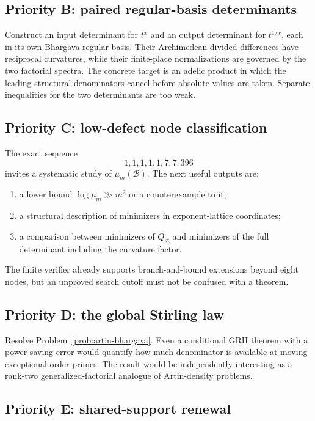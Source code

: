 \documentclass[11pt,oneside]{article}
\theoremstyle{definition}
\theoremstyle{remark}
\newcommand{\B}{\mathcal B}
\begin{document}
\subsection{Priority B: paired regular-basis determinants}

Construct an input determinant for \(t^x\) and an output determinant for \(t^{1/x}\), each in
its own Bhargava regular basis.  Their Archimedean divided differences have reciprocal
curvatures, while their finite-place normalizations are governed by the two factorial spectra.
The concrete target is an adelic product in which the leading structural denominators cancel
before absolute values are taken.  Separate inequalities for the two determinants are too
weak.

\subsection{Priority C: low-defect node classification}

The exact sequence
\[
 1,1,1,1,1,7,7,396
\]
invites a systematic study of \(\mu_m(\B)\).  The next useful outputs are:
\begin{enumerate}
\item a lower bound \(\log\mu_m\gg m^2\) or a counterexample to it;
\item a structural description of minimizers in exponent-lattice coordinates;
\item a comparison between minimizers of \(Q_{\B}\) and minimizers of the full determinant
including the curvature factor.
\end{enumerate}
The finite verifier already supports branch-and-bound extensions beyond eight nodes, but an
unproved search cutoff must not be confused with a theorem.

\subsection{Priority D: the global Stirling law}

Resolve Problem~\ref{prob:artin-bhargava}.  Even a conditional GRH theorem with a power-saving
error would quantify how much denominator is available at moving exceptional-order primes.
The result would be independently interesting as a rank-two generalized-factorial analogue of
Artin-density problems.

\subsection{Priority E: shared-support renewal}
\end{document}
